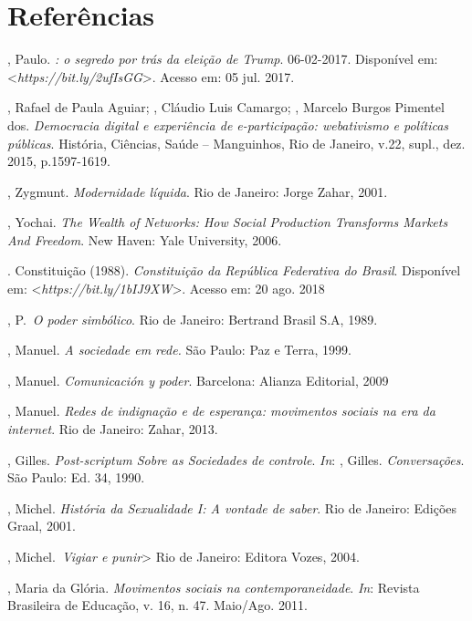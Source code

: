 \section{Referências}

\begin{Parskip}
, Paulo. \emph{: o segredo por trás da eleição de Trump}.
06-02-2017. Disponível em: \textless{}\emph{https://bit.ly/2ufIsGG}\textgreater{}. Acesso em: 05 jul. 2017.

, Rafael de Paula Aguiar; , Cláudio Luis Camargo; ,
Marcelo Burgos Pimentel dos. \emph{Democracia digital e experiência de
e-participação: webativismo e políticas públicas}. História, Ciências,
Saúde -- Manguinhos, Rio de Janeiro, v.22, supl., dez. 2015,
p.1597-1619.

, Zygmunt. \emph{Modernidade líquida}. Rio de Janeiro: Jorge Zahar, 2001.

, Yochai. \emph{The Wealth of Networks: How Social Production
Transforms Markets And Freedom}. New Haven: Yale University, 2006.

. Constituição (1988). \emph{Constituição da República
Federativa do Brasil}. Disponível em: \textless{}\emph{https://bit.ly/1bIJ9XW}\textgreater{}. Acesso em: 20 ago. 2018

, P.~\emph{O poder simbólico}. Rio de Janeiro: Bertrand Brasil
S.A, 1989.

, Manuel. \emph{A sociedade em rede.} São Paulo: Paz e Terra,
1999.

, Manuel. \emph{Comunicación y poder}. Barcelona: Alianza
Editorial, 2009

, Manuel. \emph{Redes de indignação e de esperança:
movimentos sociais na era da internet}. Rio de Janeiro: Zahar, 2013.

, Gilles. \emph{Post-scriptum Sobre as Sociedades de controle}. \emph{In}: , Gilles. \emph{Conversações}. São Paulo: Ed. 34, 1990.

, Michel. \emph{História da Sexualidade I: A vontade de
saber}. Rio de Janeiro: Edições Graal, 2001.

, Michel.~\emph{Vigiar e punir}> Rio de Janeiro: Editora Vozes, 2004.

, Maria da Glória. \emph{Movimentos sociais na contemporaneidade}.
\emph{In}: Revista Brasileira de Educação, v. 16, n. 47. Maio/Ago. 2011.


\end{Parskip}
